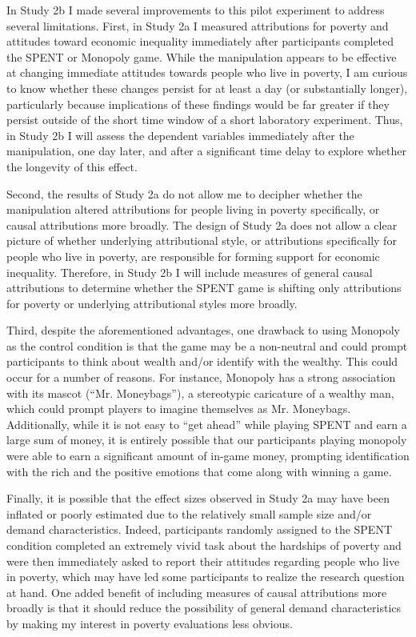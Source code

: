 \documentclass{sfuthesis}
\begin{document}
In Study 2b I made several improvements to this pilot experiment to address several limitations. First, in Study 2a I measured attributions for poverty and attitudes toward economic inequality immediately after participants completed the SPENT or Monopoly game. While the manipulation appears to be effective at changing immediate attitudes towards people who live in poverty, I am curious to know whether these changes persist for at least a day (or substantially longer), particularly because implications of these findings would be far greater if they persist outside of the short time window of a short laboratory experiment. Thus, in Study 2b I will assess the dependent variables immediately after the manipulation, one day later, and after a significant time delay to explore whether the longevity of this effect. 

Second, the results of Study 2a do not allow me to decipher whether the manipulation altered attributions for people living in poverty specifically, or causal attributions more broadly. The design of Study 2a does not allow a clear picture of whether underlying attributional style, or attributions specifically for people who live in poverty, are responsible for forming support for economic inequality. Therefore, in Study 2b I will include measures of general causal attributions to determine whether the SPENT game is shifting only attributions for poverty or underlying attributional styles more broadly.

Third, despite the aforementioned advantages, one drawback to using Monopoly as the control condition is that the game may be a non-neutral and could prompt participants to think about wealth and/or identify with the wealthy. This could occur for a number of reasons. For instance, Monopoly has a strong association with its mascot (“Mr. Moneybags”), a stereotypic caricature of a wealthy man, which could prompt players to imagine themselves as Mr. Moneybags. Additionally, while it is not easy to “get ahead” while playing SPENT and earn a large sum of money, it is entirely possible that our participants playing monopoly were able to earn a significant amount of in-game money, prompting identification with the rich and the positive emotions that come along with winning a game. 

Finally, it is possible that the effect sizes observed in Study 2a may have been inflated or poorly estimated due to the relatively small sample size and/or demand characteristics. Indeed, participants randomly assigned to the SPENT condition completed an extremely vivid task about the hardships of poverty and were then immediately asked to report their attitudes regarding people who live in poverty, which may have led some participants to realize the research question at hand. One added benefit of including measures of causal attributions more broadly is that it should reduce the possibility of general demand characteristics by making my interest in poverty evaluations less obvious.
\end{document}
